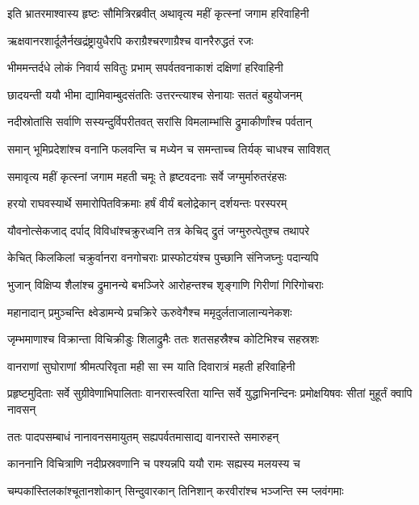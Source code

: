 \twolineshloka
{इति भ्रातरमाश्वास्य हृष्टः सौमित्रिरब्रवीत्}
{अथावृत्य महीं कृत्स्नां जगाम हरिवाहिनी} %

\twolineshloka
{ऋक्षवानरशार्दूलैर्नखद्रंष्ट्रायुधैरपि}
{कराग्रैश्चरणाग्रैश्च वानरैरुद्धतं रजः} %

\twolineshloka
{भीममन्तर्दधे लोकं निवार्य सवितुः प्रभाम्}
{सपर्वतवनाकाशं दक्षिणां हरिवाहिनी} %

\twolineshloka
{छादयन्ती ययौ भीमा द्यामिवाम्बुदसंततिः}
{उत्तरन्त्याश्च सेनायाः सततं बहुयोजनम्} %

\twolineshloka
{नदीस्रोतांसि सर्वाणि सस्यन्दुर्विपरीतवत्}
{सरांसि विमलाम्भांसि द्रुमाकीर्णांश्च पर्वतान्} %

\twolineshloka
{समान् भूमिप्रदेशांश्च वनानि फलवन्ति च}
{मध्येन च समन्ताच्च तिर्यक् चाधश्च साविशत्} %

\twolineshloka
{समावृत्य महीं कृत्स्नां जगाम महती चमूः}
{ते हृष्टवदनाः सर्वे जग्मुर्मारुतरंहसः} %

\twolineshloka
{हरयो राघवस्यार्थे समारोपितविक्रमाः}
{हर्षं वीर्यं बलोद्रेकान् दर्शयन्तः परस्परम्} %

\twolineshloka
{यौवनोत्सेकजाद् दर्पाद् विविधांश्चक्रुरध्वनि}
{तत्र केचिद् द्रुतं जग्मुरुत्पेतुश्च तथापरे} %

\twolineshloka
{केचित् किलकिलां चक्रुर्वानरा वनगोचराः}
{प्रास्फोटयंश्च पुच्छानि संनिजघ्नुः पदान्यपि} %

\twolineshloka
{भुजान् विक्षिप्य शैलांश्च द्रुमानन्ये बभञ्जिरे}
{आरोहन्तश्च शृङ्गाणि गिरीणां गिरिगोचराः} %

\twolineshloka
{महानादान् प्रमुञ्चन्ति क्ष्वेडामन्ये प्रचक्रिरे}
{ऊरुवेगैश्च ममृदुर्लताजालान्यनेकशः} %

\twolineshloka
{जृम्भमाणाश्च विक्रान्ता विचिक्रीडुः शिलाद्रुमैः}
{ततः शतसहस्रैश्च कोटिभिश्च सहस्रशः} %

\twolineshloka
{वानराणां सुघोराणां श्रीमत्परिवृता मही}
{सा स्म याति दिवारात्रं महती हरिवाहिनी} %

\threelineshloka
{प्रहृष्टमुदिताः सर्वे सुग्रीवेणाभिपालिताः}
{वानरास्त्वरिता यान्ति सर्वे युद्धाभिनन्दिनः}
{प्रमोक्षयिषवः सीतां मुहूर्तं क्वापि नावसन्} %

\twolineshloka
{ततः पादपसम्बाधं नानावनसमायुतम्}
{सह्यपर्वतमासाद्य वानरास्ते समारुहन्} %

\twolineshloka
{काननानि विचित्राणि नदीप्रस्रवणानि च}
{पश्यन्नपि ययौ रामः सह्यस्य मलयस्य च} %

\twolineshloka
{चम्पकांस्तिलकांश्चूतानशोकान् सिन्दुवारकान्}
{तिनिशान् करवीरांश्च भञ्जन्ति स्म प्लवंगमाः} %

